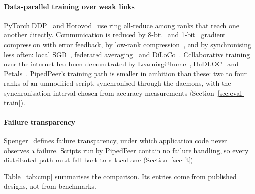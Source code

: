\documentclass[5p,times,twocolumn]{elsarticle}
\begin{document}
\paragraph{Data-parallel training over weak links} PyTorch
DDP~\cite{li2020pytorchddp} and Horovod~\cite{sergeev2018horovod} use ring
all-reduce among ranks that reach one another directly. Communication is
reduced by 8-bit~\cite{dettmers2016eightbit} and 1-bit~\cite{seide2014onebit}
gradient compression with error feedback, by low-rank
compression~\cite{vogels2019powersgd}, and by synchronising less often: local
SGD~\cite{stich2019localsgd,lin2020localsgd}, federated
averaging~\cite{mcmahan2017fedavg} and DiLoCo~\cite{douillard2023diloco}.
Collaborative training over the internet has been demonstrated by
Learning@home~\cite{ryabinin2020learningathome}, DeDLOC~\cite{diskin2021dedloc}
and Petals~\cite{borzunov2023petals}. PipedPeer's training path is smaller in
ambition than these: two to four ranks of an unmodified script, synchronised
through the daemons, with the synchronisation interval chosen from accuracy
measurements (Section~\ref{sec:eval-train}).

\paragraph{Failure transparency} Spenger~\cite{kth2025thesis} defines failure
transparency, under which application code never observes a failure. Scripts
run by PipedPeer contain no failure handling, so every distributed path must
fall back to a local one (Section~\ref{sec:ft}).

Table~\ref{tab:cmp} summarises the comparison. Its entries come from published
designs, not from benchmarks.
\end{document}
